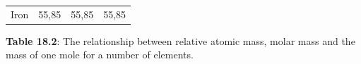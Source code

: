 {{\begin{center}
\begin{tabular}[t]{|l|l|l|l|}
    
        Iron &
    
    
        55,85 &
    
    
        55,85 &
    
    
        55,85%
     \tabularnewline\cline{1-1}\cline{2-2}\cline{3-3}\cline{4-4}
    \end{tabular}
      \end{center}
    \begin{center}{\small\bfseries Table 18.2}: The relationship between relative atomic mass, molar mass and the mass of one mole for a number of elements.\end{center}
    
    \addtocounter{footnote}{-0}
    
          }{ %
        
    
        \begin{center}
      
      \label{m38717*uid11}
      
    \noindent
      \tablelasttail{}
      \begin{xtabular}[t]{|l|l|l|l|}\hline
    

\end{xtabular}
\end{center}}}
